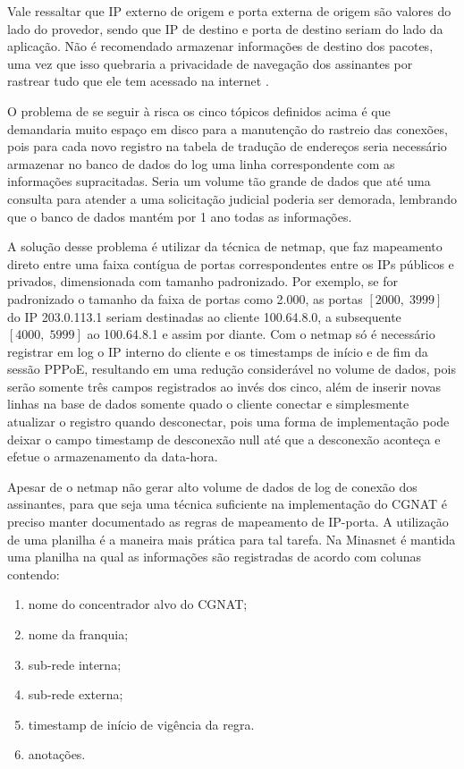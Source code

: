    Vale ressaltar que IP externo de origem e porta externa de origem são valores do lado do provedor, sendo que IP de destino e porta de destino seriam do lado da aplicação. Não é recomendado armazenar informações de destino dos pacotes, uma vez que isso quebraria a privacidade de navegação dos assinantes por rastrear tudo que ele tem acessado na internet \cite{rfc6888}.

   O problema de se seguir à risca os cinco tópicos definidos acima é que demandaria muito espaço em disco para a manutenção do rastreio das conexões, pois para cada novo registro na tabela de tradução de endereços seria necessário armazenar no banco de dados do log uma linha correspondente com as informações supracitadas. Seria um volume tão grande de dados que até uma consulta para atender a uma solicitação judicial poderia ser demorada, lembrando que o banco de dados mantém por 1 ano todas as informações.

   A solução desse problema é utilizar da técnica de netmap, que faz mapeamento direto entre uma faixa contígua de portas correspondentes entre os IPs públicos e privados, dimensionada com tamanho padronizado. Por exemplo, se for padronizado o tamanho da faixa de portas como 2.000, as portas $ [2000, \; 3999] $ do IP 203.0.113.1 seriam destinadas ao cliente 100.64.8.0, a subsequente $ [4000, \; 5999] $ ao 100.64.8.1 e assim por diante. Com o netmap só é necessário registrar em log o IP interno do cliente e os timestamps de início e de fim da sessão PPPoE, resultando em uma redução considerável no volume de dados, pois serão somente três campos registrados ao invés dos cinco, além de inserir novas linhas na base de dados somente quado o cliente conectar e simplesmente atualizar o registro quando desconectar, pois uma forma de implementação pode deixar o campo timestamp de desconexão null até que a desconexão aconteça e efetue o armazenamento da data-hora.

   Apesar de o netmap não gerar alto volume de dados de log de conexão dos assinantes, para que seja uma técnica suficiente na implementação do CGNAT é preciso manter documentado as regras de mapeamento de IP-porta. A utilização de uma planilha é a maneira mais prática para tal tarefa. Na Minasnet é mantida uma planilha na qual as informações são registradas de acordo com colunas contendo:

   \begin{enumerate}[label=\alph*)]
       \item nome do concentrador alvo do CGNAT;
       \item nome da franquia;
       \item sub-rede interna;
       \item sub-rede externa;
       \item timestamp de início de vigência da regra.
       \item anotações.
   \end{enumerate}
   
